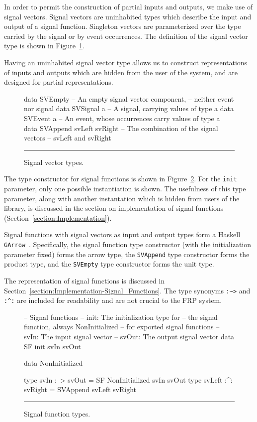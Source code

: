 \documentclass[draft]{llncs}
\begin{document}
In order to permit the construction of partial inputs and outputs, we make use
of signal vectors. Signal vectors are uninhabited types which describe the input
and output of a signal function. Singleton vectors are parameterized over the
type carried by the signal or by event occurrences. The definition of the signal
vector type is shown in Figure~\ref{figure:signal_vector_types}. 

Having an uninhabited signal vector type allows us to construct representations
of inputs and outputs which are hidden from the user of the system, and are
designed for partial representations.

\begin{figure}
\begin{code}
data SVEmpty    -- An empty signal vector component,
                -- neither event nor signal
data SVSignal a -- A signal, carrying values of type a
data SVEvent a  -- An event, whose occurrences carry values of type a
data SVAppend svLeft svRight -- The combination of the signal vectors
                             -- svLeft and svRight
\end{code}
\hrule
\caption{Signal vector types.}
\label{figure:signal_vector_types}
\end{figure}

The type constructor for signal functions is shown in
Figure~\ref{figure:signal_function_types}. For the {\tt init} parameter, only
one possible instantiation is shown. The usefulness of this type parameter,
along with another instantation which is hidden from users of the library,
is discussed in the section on implementation of signal functions
(Section~\ref{section:Implementation}).

Signal functions with signal vectors as input and output types form a
Haskell {\tt GArrow}~\cite{Megacz2011}. Specifically, the signal function
type constructor (with the initialization parameter fixed) forms the arrow
type, the {\tt SVAppend} type constructor forms the product type, and the
{\tt SVEmpty} type constructor forms the unit type.

The representation of signal functions is discussed in
Section~\ref{section:Implementation-Signal_Functions}. The type synonyms
{\tt :\textasciitilde>} and {\tt :\textasciicircum:} are included for
readability and are not crucial to the FRP system.

\begin{figure}
\begin{code}
-- Signal functions
-- init: The initialization type for 
--   the signal function, always NonInitialized
--   for exported signal functions
-- svIn: The input signal vector
-- svOut: The output signal vector
data SF init svIn svOut

data NonInitialized

type svIn :~> svOut = SF NonInitialized svIn svOut
type svLeft :^: svRight = SVAppend svLeft svRight
\end{code}
\hrule
\caption{Signal function types.}
\label{figure:signal_function_types}
\end{figure}
\end{document}
